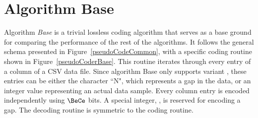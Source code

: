 

\clearpage
\section{Algorithm Base}
\label{algo:base}
\newcommand{\codeColumn}{$\text{code\_column}$}
\newcommand{\decodeColumn}{$\text{decode\_column}$}

\vspace{-10pt}
Algorithm \textit{Base} is a trivial lossless coding algorithm that serves as a base ground for comparing the performance of the rest of the algorithms. It follows the general schema presented in Figure~\ref{pseudoCodeCommon}, with a specific coding routine shown in Figure~\ref{pseudoCoderBase}. This routine iterates through every entry of a column of a CSV data file. Since algorithm Base only supports variant \NOmaskalgo, these entries can be either the character ``N", which represents a gap in the data, or an integer value representing an actual data sample. Every column entry is encoded independently using $\BeCe$ bits. A special integer, \nodata, is reserved for encoding a gap. The decoding routine is symmetric to the coding routine.





